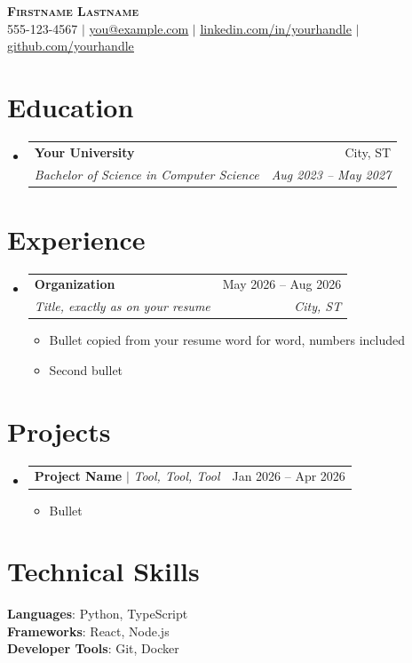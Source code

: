 \documentclass[letterpaper,11pt]{article}
\makeatletter
\newcommand{\resumeItem}[1]{\item\small{{#1 \vspace{-2pt}}}}
\newcommand{\resumeSubheading}[4]{
  \vspace{-2pt}\item
    \begin{tabular*}{0.97\textwidth}[t]{l@{\extracolsep{\fill}}r}
      \textbf{#1} & #2 \\
      \textit{\small#3} & \textit{\small #4} \\
    \end{tabular*}\vspace{-7pt}
}
\newcommand{\resumeProjectHeading}[2]{
    \item
    \begin{tabular*}{0.97\textwidth}{l@{\extracolsep{\fill}}r}
      \small#1 & #2 \\
    \end{tabular*}\vspace{-7pt}
}
\newcommand{\resumeSubHeadingListStart}{\begin{itemize}[leftmargin=0.15in, label={}]}
\newcommand{\resumeSubHeadingListEnd}{\end{itemize}}
\newcommand{\resumeItemListStart}{\begin{itemize}}
\newcommand{\resumeItemListEnd}{\end{itemize}\vspace{-5pt}}
\makeatother
\begin{document}
\begin{center}
  \textbf{\Huge \scshape Firstname Lastname} \\ \vspace{1pt}
  \small 555-123-4567 $|$ \href{mailto:you@example.com}{\underline{you@example.com}} $|$
  \href{https://linkedin.com/in/yourhandle}{\underline{linkedin.com/in/yourhandle}} $|$
  \href{https://github.com/yourhandle}{\underline{github.com/yourhandle}}
\end{center}

\section{Education}
  \resumeSubHeadingListStart
    \resumeSubheading
      {Your University}{City, ST}
      {Bachelor of Science in Computer Science}{Aug 2023 -- May 2027}
  \resumeSubHeadingListEnd

\section{Experience}
  \resumeSubHeadingListStart
    \resumeSubheading
      {Organization}{May 2026 -- Aug 2026}
      {Title, exactly as on your resume}{City, ST}
      \resumeItemListStart
        \resumeItem{Bullet copied from your resume word for word, numbers included}
        \resumeItem{Second bullet}
      \resumeItemListEnd
  \resumeSubHeadingListEnd

\section{Projects}
  \resumeSubHeadingListStart
    \resumeProjectHeading
      {\textbf{Project Name} $|$ \emph{Tool, Tool, Tool}}{Jan 2026 -- Apr 2026}
      \resumeItemListStart
        \resumeItem{Bullet}
      \resumeItemListEnd
  \resumeSubHeadingListEnd

\section{Technical Skills}
  \begin{itemize}[leftmargin=0.15in, label={}]
    \small{\item{
      \textbf{Languages}{: Python, TypeScript} \\
      \textbf{Frameworks}{: React, Node.js} \\
      \textbf{Developer Tools}{: Git, Docker}
    }}
  \end{itemize}
\end{document}
